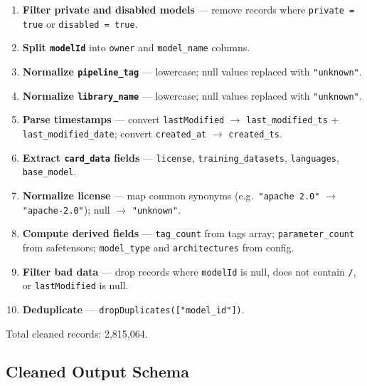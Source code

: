 \documentclass[11pt]{article}
\begin{document}
\begin{enumerate}
  \item \textbf{Filter private and disabled models} --- remove records where \texttt{private = true} or \texttt{disabled = true}.
  \item \textbf{Split \texttt{modelId}} into \texttt{owner} and \texttt{model\_name} columns.
  \item \textbf{Normalize \texttt{pipeline\_tag}} --- lowercase; null values replaced with \texttt{"unknown"}.
  \item \textbf{Normalize \texttt{library\_name}} --- lowercase; null values replaced with \texttt{"unknown"}.
  \item \textbf{Parse timestamps} --- convert \texttt{lastModified} $\rightarrow$ \texttt{last\_modified\_ts} + \texttt{last\_modified\_date}; convert \texttt{created\_at} $\rightarrow$ \texttt{created\_ts}.
  \item \textbf{Extract \texttt{card\_data} fields} --- \texttt{license}, \texttt{training\_datasets}, \texttt{languages}, \texttt{base\_model}.
  \item \textbf{Normalize license} --- map common synonyms (e.g.\ \texttt{"apache 2.0"} $\rightarrow$ \texttt{"apache-2.0"}); null $\rightarrow$ \texttt{"unknown"}.
  \item \textbf{Compute derived fields} --- \texttt{tag\_count} from tags array; \texttt{parameter\_count} from safetensors; \texttt{model\_type} and \texttt{architectures} from config.
  \item \textbf{Filter bad data} --- drop records where \texttt{modelId} is null, does not contain \texttt{/}, or \texttt{lastModified} is null.
  \item \textbf{Deduplicate} --- \texttt{dropDuplicates(["model\_id"])}.
\end{enumerate}

Total cleaned records: 2,815,064.

\subsection{Cleaned Output Schema}
\end{document}
